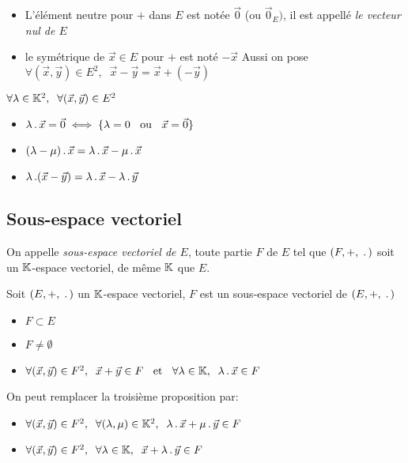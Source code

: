 \begin{dfn}[Notations]
\begin{itemize}
    \item L'élément neutre pour $+$ dans $E$ est notée $\vec{0}$
    (ou $\vec{0}_E)$, il est appellé \emph{le vecteur nul de $E$}
    \item le symétrique de $\vec{x} \in E$ pour $+$ est noté $-\vec{x}$
    Aussi on pose $\forall (\vec{x}, \vec{y}) \in E^2, \;\; \vec{x} - \vec{y}
    = \vec{x} + (-\vec{y})$
\end{itemize}
\end{dfn}

\begin{prp}
$\forall \lambda \in \mathbb{K}^2, \;\; \forall (\vec{x}, \vec{y}) \in E^2$
\begin{itemize}
    \item $\lambda \operatorname{.} \vec{x} = \vec{0} \iff \{\lambda = 0 \;\;\text{ ou }\;\;
    \vec{x} = \vec{0}\}$
    \item $(\lambda - \mu) \operatorname{.} \vec{x} = \lambda \operatorname{.} \vec{x} - 
    \mu \operatorname{.} \vec{x}$
    \item $\lambda \operatorname{.} (\vec{x} - \vec{y}) = \lambda \operatorname{.} \vec{x} - 
    \lambda \operatorname{.} \vec{y}$
\end{itemize}
\end{prp}


\subsection{Sous-espace vectoriel}

\begin{dfn}
On appelle \emph{sous-espace vectoriel de $E$}, toute partie $F$ de $E$ tel que
$(F, +, \;\operatorname{.}\,)$ soit un $\mathbb{K}$-espace vectoriel, de même $\mathbb{K}$ que $E$.
\end{dfn}

\begin{prp}
Soit $(E, +, \;\operatorname{.}\,)$ un $\mathbb{K}$-espace vectoriel, $F$ est un
sous-espace vectoriel de $(E, +, \;\operatorname{.}\,)$ \ssi
\begin{itemize}
    \item $F \subset E$
    \item $F \neq \emptyset$
    \item $\forall (\vec{x}, \vec{y}) \in F^2, \;\; \vec{x} + \vec{y} \in F
    \;\;\text{ et }\;\; \forall \lambda \in \mathbb{K}, \;\; \lambda \operatorname{.} \vec{x} \in F$
\end{itemize}
On peut remplacer la troisième proposition par:
\begin{itemize}
    \item $\forall (\vec{x}, \vec{y}) \in F^2, \;\;
    \forall (\lambda, \mu) \in \mathbb{K}^2, \;\; \lambda \operatorname{.} \vec{x} +
    \mu \operatorname{.} \vec{y} \in F$
    \item $\forall (\vec{x}, \vec{y}) \in F^2, \;\;
    \forall \lambda \in \mathbb{K}, \;\;
    \vec{x} + \lambda \operatorname{.} \vec{y} \in F$
\end{itemize}
\end{prp}

